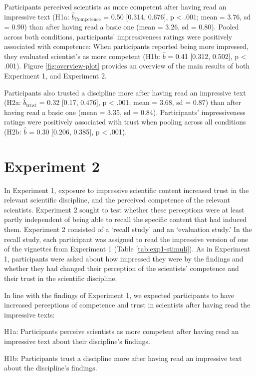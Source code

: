 \documentclass[
  english,
  doc,floatsintext]{apa6}
\begin{document}
Participants perceived scientists as more competent after having read an impressive text (H1a: \(\hat{b}_{\text{Competence}}\) = 0.50 {[}0.314, 0.676{]}, p \textless{} .001; mean = 3.76, sd = 0.90) than after having read a basic one (mean = 3.26, sd = 0.80). Pooled across both conditions, participants' impressiveness ratings were positively associated with competence: When participants reported being more impressed, they evaluated scientist's as more competent (H1b: \(\hat{b}\) = 0.41 {[}0.312, 0.502{]}, p \textless{} .001). Figure \ref{fig:overview-plot} provides an overview of the main results of both Experiment 1, and Experiment 2.

Participants also trusted a discipline more after having read an impressive text (H2a: \(\hat{b}_{\text{trust}}\) = 0.32 {[}0.17, 0.476{]}, p \textless{} .001; mean = 3.68, sd = 0.87) than after having read a basic one (mean = 3.35, sd = 0.84). Participants' impressiveness ratings were positively associated with trust when pooling across all conditions (H2b: \(\hat{b}\) = 0.30 {[}0.206, 0.385{]}, p \textless{} .001).

\section{Experiment 2}\label{experiment-2}

In Experiment 1, exposure to impressive scientific content increased trust in the relevant scientific discipline, and the perceived competence of the relevant scientists. Experiment 2 sought to test whether these perceptions were at least partly independent of being able to recall the specific content that had induced them. Experiment 2 consisted of a `recall study' and an `evaluation study.' In the recall study, each participant was assigned to read the impressive version of one of the vignettes from Experiment 1 (Table \ref{tab:exp1-stimuli}). As in Experiment 1, participants were asked about how impressed they were by the findings and whether they had changed their perception of the scientists' competence and their trust in the scientific discipline.

In line with the findings of Experiment 1, we expected participants to have increased perceptions of competence and trust in scientists after having read the impressive texts:

H1a: Participants perceive scientists as more competent after having read an impressive text about their discipline's findings.

H1b: Participants trust a discipline more after having read an impressive text about the discipline's findings.
\end{document}
